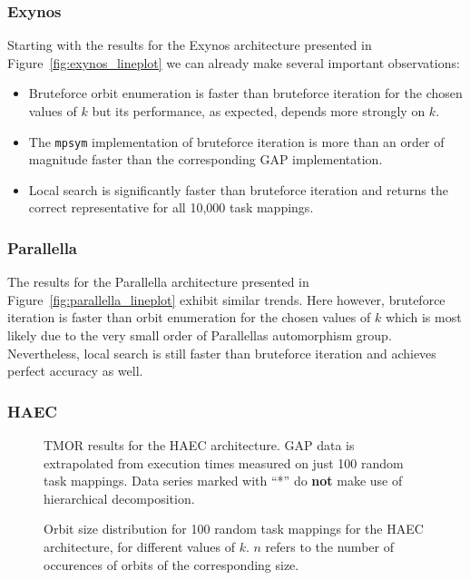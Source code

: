 \subsubsection{Exynos}

Starting with the results for the Exynos architecture presented in
Figure~\ref{fig:exynos_lineplot} we can already make several important
observations:
%
\begin{itemize}
  \item Bruteforce orbit enumeration is faster than bruteforce iteration for
        the chosen values of $k$ but its performance, as expected, depends
        more strongly on $k$.
  \item The \texttt{mpsym} implementation of bruteforce iteration is more than an
        order of magnitude faster than the corresponding GAP implementation.
  \item Local search is significantly faster than bruteforce iteration and
        returns the correct representative for all 10,000 task mappings.
\end{itemize}

\subsubsection{Parallella}

The results for the Parallella architecture presented in
Figure~\ref{fig:parallella_lineplot} exhibit similar trends. Here however,
bruteforce iteration is faster than orbit enumeration for the chosen
values of $k$ which is most likely due to the very small order of Parallellas
automorphism group. Nevertheless, local search is still faster than bruteforce
iteration and achieves perfect accuracy as well.

\subsubsection{HAEC}

\begin{figure}
  \centering
  
  \caption{TMOR results for the HAEC architecture. GAP data is extrapolated
           from execution times measured on just 100 random task mappings.
           Data series marked with ``*'' do \textbf{not} make use of
           hierarchical decomposition.}
  \label{fig:haec_lineplot}
  \vspace{1cm}
  
  \caption{Orbit size distribution for 100 random task mappings for the HAEC
           architecture, for different values of $k$. $n$ refers to the number
           of occurences of orbits of the corresponding size.}
  \label{fig:haec_histogram}
\end{figure}

